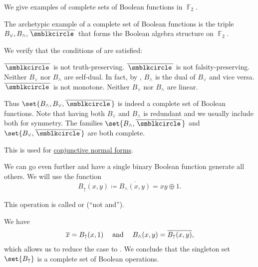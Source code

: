 \begin{example}\label{ex:posts_completeness_theorem}
  We give examples of complete sets of Boolean functions in \( \BbbF_2 \).

  \begin{thmenum}
     The archetypic example of a complete set of Boolean functions is the triple \( B_\vee, B_\wedge, \overline{\placeholder} \) that forms the Boolean algebra structure on \( \BbbF_2 \).

    We verify that the conditions of  are satisfied:
    \begin{refenum}
       \( \overline{\placeholder} \) is not truth-preserving.
       \( \overline{\placeholder} \) is not falsity-preserving.
       Neither \( B_\vee \) nor \( B_\wedge \) are self-dual. In fact, by , \( B_\wedge \) is the dual of \( B_\vee \) and vice versa.
       \( \overline{\placeholder} \) is not monotone.
       Neither \( B_\vee \) nor \( B_\wedge \) are linear.
    \end{refenum}

    Thus \( \set{ B_\wedge, B_\vee, \overline{\placeholder} } \) is indeed a complete set of Boolean functions. Note that having both \( B_\vee \) and \( B_\wedge \) is redundant and we usually include both for symmetry. The families \( \set{ B_\wedge, \overline{\placeholder} } \) and \( \set{ B_\vee, \overline{\placeholder} } \) are both complete.

    This is used for \hyperref[alg:conjunctive_normal_form_reduction]{conjunctive normal forms}.

     We can go even further and have a single binary Boolean function generate all others. We will use the function
    \begin{equation}\label{eq:ex:posts_completeness_theorem/nand}
      B_\uparrow(x, y) \coloneqq \overline{B_\wedge(x, y)} = xy \oplus 1.
    \end{equation}

    This operation is called  or  (\enquote{not and}).

    We have
    \begin{equation*}
      \begin{array}{ccc}
        \overline{x} = B_\uparrow(x, 1)
        &
        \thickspace \text{and} \thickspace
        &
        B_\wedge(x, y) = \overline{B_\uparrow(x, y)},
      \end{array}
    \end{equation*}
    which allows us to reduce the case to . We conclude that the singleton set \( \set{ B_\uparrow } \) is a complete set of Boolean operations.


\end{thmenum}
\end{example}
